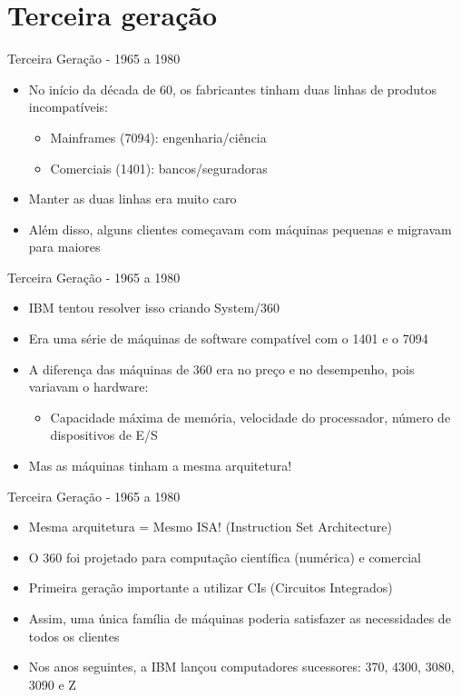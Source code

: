 \documentclass{beamer}
\begin{document}
  \section{Terceira geração}
  \begin{frame}{Terceira Geração - 1965 a 1980}
      \begin{itemize}
          \item No início da década de 60, os fabricantes tinham duas linhas de produtos incompatíveis:
                \begin{itemize}
                    \item Mainframes (7094): engenharia/ciência
                    \item Comerciais (1401): bancos/seguradoras
                \end{itemize}
          \item Manter as duas linhas era muito caro
          \item Além disso, alguns clientes começavam com máquinas pequenas e migravam para maiores
      \end{itemize}
  \end{frame}
  \begin{frame}{Terceira Geração - 1965 a 1980}
      \begin{itemize}
          \item IBM tentou resolver isso criando System/360
          \item Era uma série de máquinas de software compatível com o 1401 e o 7094
          \item A diferença das máquinas de 360 era no preço e no desempenho, pois variavam o hardware:
                \begin{itemize}
                    \item Capacidade máxima de memória, velocidade do processador, número de dispositivos de E/S
                \end{itemize}
          \item Mas as máquinas tinham a mesma arquitetura!
      \end{itemize}
  \end{frame}
  \begin{frame}{Terceira Geração - 1965 a 1980}
      \begin{itemize}
          \item Mesma arquitetura = Mesmo ISA! (Instruction Set Architecture)
          \item O 360 foi projetado para computação científica (numérica) e comercial
          \item Primeira geração importante a utilizar CIs (Circuitos Integrados)
          \item Assim, uma única família de máquinas poderia satisfazer as necessidades de todos os clientes
          \item Nos anos seguintes, a IBM lançou computadores sucessores: 370, 4300, 3080, 3090 e Z
      \end{itemize}
  \end{frame}
\end{document}
